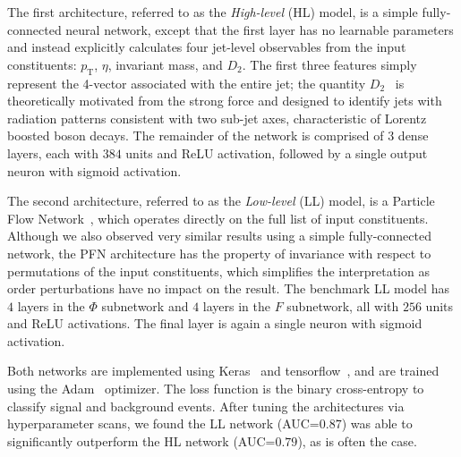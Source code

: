 \documentclass[reprint,nofootinbib,...]{revtex4-1}
\newcommand{\nconst}{64}       %
\newcommand{\HLLayers}{3}
\newcommand{\HLUnits}{384}
\newcommand{\HLAuc}{0.79}
\newcommand{\PfnPhiLayers}{4}
\newcommand{\PfnFLayers}{4}
\newcommand{\PfnUnits}{256}
\newcommand{\PfnAuc}{0.87}
\newcommand{\nlayerCLS}{3}     %
\newcommand{\nunitsCLS}{256} %
\newcommand{\pt}{p_\mathrm{T}} %
\begin{document}
The first architecture, referred to as the \textit{High-level} (HL) model, is a simple fully-connected neural network, except that the first layer has no learnable parameters and instead explicitly calculates four jet-level observables from the input constituents: $\pt$, $\eta$, invariant mass, and $D_2$.
The first three features simply represent the 4-vector associated with the entire jet; the quantity $D_2$~\cite{Larkoski:2014gra} is theoretically motivated from the strong force and designed to identify jets with radiation patterns consistent with two sub-jet axes, characteristic of Lorentz boosted boson decays.
The remainder of the network is comprised of $\HLLayers$ dense layers, each with $\HLUnits$ units and ReLU activation, followed by a single output neuron with sigmoid activation.

The second architecture, referred to as the \textit{Low-level} (LL) model, is a Particle Flow Network~\cite{Komiske:2018cqr}, which operates directly on the full list of input constituents.
Although we also observed very similar results using a simple fully-connected network, the PFN architecture has the property of invariance with respect to permutations of the input constituents, which simplifies the interpretation as order perturbations have no impact on the result.
The benchmark LL model has $\PfnPhiLayers$ layers in the $\Phi$ subnetwork and $\PfnFLayers$ layers in the $F$ subnetwork, all with $\PfnUnits$ units and ReLU activations.
The final layer is again a single neuron with sigmoid activation.

Both networks are implemented using Keras~\cite{keras} and tensorflow~\cite{tensorflow}, and are trained using the Adam~\cite{adam} optimizer.
The loss function is the binary cross-entropy to classify signal and background events.
After tuning the architectures via hyperparameter scans, we found the LL network (AUC=$\PfnAuc$) was able to significantly outperform the HL network (AUC=$\HLAuc$), as is often the case.


\end{document}
